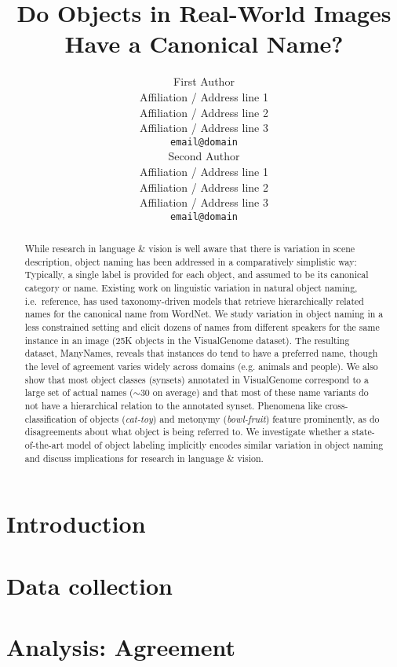 \documentclass[11pt,a4paper]{article}
\title{Do Objects in Real-World Images Have a Canonical Name?}
\author{First Author \\
  Affiliation / Address line 1 \\
  Affiliation / Address line 2 \\
  Affiliation / Address line 3 \\
  {\tt email@domain} \\\And
  Second Author \\
  Affiliation / Address line 1 \\
  Affiliation / Address line 2 \\
  Affiliation / Address line 3 \\
  {\tt email@domain} \\}
\date{}
\begin{document}
\maketitle

\begin{abstract}
While research in language \& vision is well aware that there is variation in scene description, object naming has been addressed in a comparatively simplistic way: 
Typically, a single label is provided for each object, and assumed to be its canonical category or name.
Existing work on linguistic variation in natural object naming, i.e.\ reference, has used taxonomy-driven models that retrieve hierarchically related names for the canonical name from WordNet. 
We study variation in object naming in a less constrained setting and elicit dozens of names from different speakers for the same instance in an image (25K objects in the VisualGenome dataset).
The resulting dataset, ManyNames, reveals that instances do tend to have a preferred name, though the level of agreement varies widely across domains (e.g. animals and people).
 We also show that most object classes (synsets) annotated in VisualGenome correspond to a large set of actual names ($\sim$30 on average) and that most of these name variants do not have a hierarchical relation to the annotated synset.
 Phenomena like cross-classification of objects (\textit{cat-toy}) and metonymy (\textit{bowl-fruit}) feature prominently, as do disagreements about what object is being referred to.
 We investigate whether a state-of-the-art model of object labeling implicitly encodes similar variation in object naming and discuss implications for research in language \& vision.
\end{abstract}

\section{Introduction}


%

\section{Data collection}
\label{sec:data}


\section{Analysis: Agreement}
\label{sec:analysis}

\end{document}
